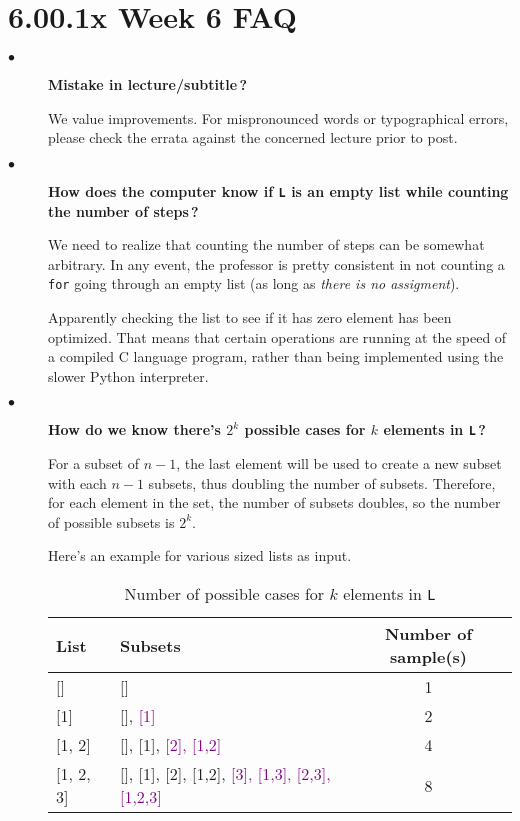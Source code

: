 \documentclass{article}
\newcommand{\inlinecode}[1]{\texttt{#1}}
\newcommand{\question}[1]{\item[$\bullet$] 
	\begin{minipage}[t]{\textwidth}
		\bfseries#1
	\end{minipage}
	\hfil
}
\newenvironment{answer}{}{}
\newenvironment{faq}{\begin{description}}{\end{description}}
\begin{document}
	
	\section*{\Huge6.00.1x Week 6 FAQ}
	
	\begin{faq}
		\question{Mistake in lecture/subtitle\,?}
		\begin{answer}
			We value improvements. For mispronounced words or typographical errors, please check the errata against the concerned lecture prior to post.
		\end{answer}
		
		\question{How does the computer know if \inlinecode{L} is an empty list while counting the number of steps\,?}
		\begin{answer}
			We need to realize that counting the number of steps can be somewhat arbitrary. In any event, the professor is pretty consistent in not counting a \inlinecode{for} going through an empty list (as long as \emph{there is no assigment}).
			
			Apparently checking the list to see if it has zero element has been optimized. That means that certain operations are running at the speed of a compiled C language program, rather than being implemented using the slower Python interpreter.
		\end{answer}
		
		\question{How do we know there's $2^k$ possible cases for $k$ elements in \inlinecode{L}\,?}
		\begin{answer}
			For a subset of $n-1$, the last element will be used to create a new subset with each $n-1$ subsets, thus doubling the number of subsets. Therefore, for each element in the set, the number of subsets doubles, so the number of possible subsets is $2^k$.
			
			Here's an example for various sized lists as input.
			
			\begin{table}[htb]
				\centering \caption{Number of possible cases for $k$ elements in \texttt{L}}
				\begin{tabular}{llc}
					List        & Subsets                                                             & Number of sample(s)\\
					\hline
					{[}]        & []                                                                  & 1\\
					{[}1]       & [], \textcolor{purple}{[1]}                                         & 2\\
					{[}1, 2]    & [], [1], \textcolor{purple}{[2], [1,2]}                             & 4\\
					{[}1, 2, 3] & [], [1], [2], [1,2], \textcolor{purple}{[3], [1,3], [2,3], [1,2,3]} & 8
				\end{tabular}
			\end{table}
		\end{answer}
		

\end{faq}
\end{document}

